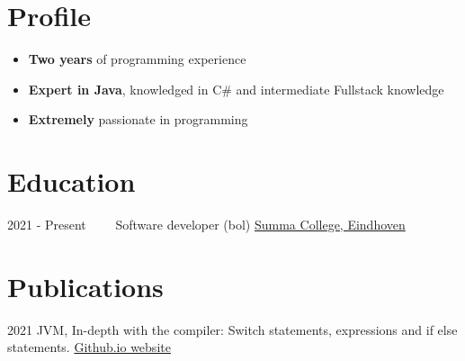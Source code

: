 \documentclass[letterpaper]{twentysecondcv} %
\begin{document}
\makesidebarFirst %

\section{Profile}

\begin{itemize}
	\item \textbf{Two years} of programming experience
	\item \textbf{Expert in Java}, knowledged in C\# and intermediate Fullstack knowledge
	\item \textbf{Extremely} passionate in programming
\end{itemize}

\vspace{6mm}


\section{Education}

\begin{twenty} %
	\twentyitem
    	{2021 - Present~~~~}
        {}
        {Software developer (bol)}
        {\href{https://www.summacollege.nl/}{Summa College, Eindhoven}}
        {}
        {}
\end{twenty}



\section{Publications}
\begin{twenty} %
	\twentyitem
    		{2021}
		        {}
        		{JVM, In-depth with the compiler: Switch statements, expressions and if else statements.}
        		{\href{https://tais993.github.io/article}{Github.io website}}
        		{}
        		{}
\end{twenty}
\end{document}
